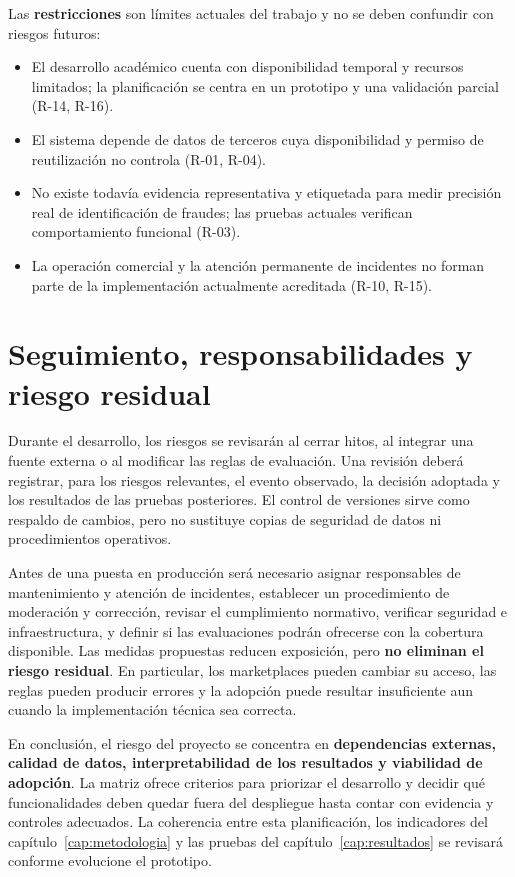 Las \textbf{restricciones} son límites actuales del trabajo y no se deben confundir con riesgos futuros:
\begin{itemize}
    \item El desarrollo académico cuenta con disponibilidad temporal y recursos limitados; la planificación se centra en un prototipo y una validación parcial (R-14, R-16).
    \item El sistema depende de datos de terceros cuya disponibilidad y permiso de reutilización no controla (R-01, R-04).
    \item No existe todavía evidencia representativa y etiquetada para medir precisión real de identificación de fraudes; las pruebas actuales verifican comportamiento funcional (R-03).
    \item La operación comercial y la atención permanente de incidentes no forman parte de la implementación actualmente acreditada (R-10, R-15).
\end{itemize}

\section{Seguimiento, responsabilidades y riesgo residual}\label{sec:ml-riesgos-seguimiento}

Durante el desarrollo, los riesgos se revisarán al cerrar hitos, al integrar una fuente externa o al modificar las reglas de evaluación. Una revisión deberá registrar, para los riesgos relevantes, el evento observado, la decisión adoptada y los resultados de las pruebas posteriores. El control de versiones sirve como respaldo de cambios, pero no sustituye copias de seguridad de datos ni procedimientos operativos.

Antes de una puesta en producción será necesario asignar responsables de mantenimiento y atención de incidentes, establecer un procedimiento de moderación y corrección, revisar el cumplimiento normativo, verificar seguridad e infraestructura, y definir si las evaluaciones podrán ofrecerse con la cobertura disponible. Las medidas propuestas reducen exposición, pero \textbf{no eliminan el riesgo residual}. En particular, los marketplaces pueden cambiar su acceso, las reglas pueden producir errores y la adopción puede resultar insuficiente aun cuando la implementación técnica sea correcta.

En conclusión, el riesgo del proyecto se concentra en \textbf{dependencias externas, calidad de datos, interpretabilidad de los resultados y viabilidad de adopción}. La matriz ofrece criterios para priorizar el desarrollo y decidir qué funcionalidades deben quedar fuera del despliegue hasta contar con evidencia y controles adecuados. La coherencia entre esta planificación, los indicadores del capítulo~\ref{cap:metodologia} y las pruebas del capítulo~\ref{cap:resultados} se revisará conforme evolucione el prototipo.

